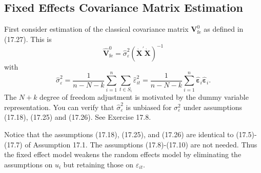 \documentclass[10pt]{article}
\begin{document}
\subsection{Fixed Effects Covariance Matrix Estimation}
First consider estimation of the classical covariance matrix $\boldsymbol{V}_{\mathrm{fe}}^{0}$ as defined in (17.27). This is
$$
\widehat{\boldsymbol{V}}_{\mathrm{fe}}^{0}=\widehat{\sigma}_{\varepsilon}^{2}\left(\dot{\boldsymbol{X}}^{\prime} \dot{\boldsymbol{X}}\right)^{-1}
$$
with
$$
\widehat{\sigma}_{\varepsilon}^{2}=\frac{1}{n-N-k} \sum_{i=1}^{n} \sum_{t \in S_{i}} \widehat{\varepsilon}_{i t}^{2}=\frac{1}{n-N-k} \sum_{i=1}^{n} \widehat{\boldsymbol{\varepsilon}}_{i} \widehat{\boldsymbol{\varepsilon}}_{i} .
$$
The $N+k$ degree of freedom adjustment is motivated by the dummy variable representation. You can verify that $\widehat{\sigma}_{\varepsilon}^{2}$ is unbiased for $\sigma_{\varepsilon}^{2}$ under assumptions (17.18), (17.25) and (17.26). See Exercise 17.8.

Notice that the assumptions (17.18), (17.25), and (17.26) are identical to (17.5)-(17.7) of Assumption 17.1. The assumptions (17.8)-(17.10) are not needed. Thus the fixed effect model weakens the random effects model by eliminating the assumptions on $u_{i}$ but retaining those on $\varepsilon_{i t}$.
\end{document}
